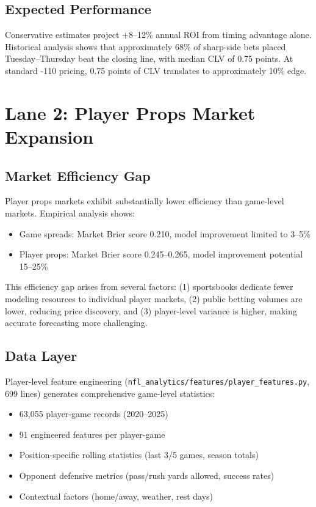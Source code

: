 \subsection{Expected Performance}

Conservative estimates project +8--12\% annual ROI from timing advantage alone. Historical analysis shows that approximately 68\% of sharp-side bets placed Tuesday--Thursday beat the closing line, with median CLV of 0.75 points. At standard -110 pricing, 0.75 points of CLV translates to approximately 10\% edge.

\section{Lane 2: Player Props Market Expansion}

\subsection{Market Efficiency Gap}

Player props markets exhibit substantially lower efficiency than game-level markets. Empirical analysis shows:
\begin{itemize}
  \item Game spreads: Market Brier score 0.210, model improvement limited to 3--5\%
  \item Player props: Market Brier score 0.245--0.265, model improvement potential 15--25\%
\end{itemize}

This efficiency gap arises from several factors: (1) sportsbooks dedicate fewer modeling resources to individual player markets, (2) public betting volumes are lower, reducing price discovery, and (3) player-level variance is higher, making accurate forecasting more challenging.

\subsection{Data Layer}

Player-level feature engineering (\texttt{nfl\_analytics/features/player\_features.py}, 699 lines) generates comprehensive game-level statistics:
\begin{itemize}
  \item 63,055 player-game records (2020--2025)
  \item 91 engineered features per player-game
  \item Position-specific rolling statistics (last 3/5 games, season totals)
  \item Opponent defensive metrics (pass/rush yards allowed, success rates)
  \item Contextual factors (home/away, weather, rest days)
\end{itemize}


